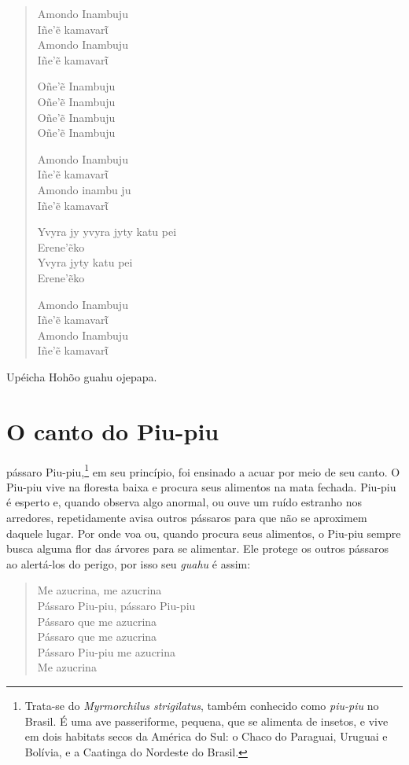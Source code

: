 \begin{verse}
Amondo Inambuju\\
Iñe'ẽ kamavarῖ\\
Amondo Inambuju\\
Iñe'ẽ kamavarῖ

Oñe'ẽ Inambuju\\
Oñe'ẽ Inambuju\\
Oñe'ẽ Inambuju\\
Oñe'ẽ Inambuju

Amondo Inambuju\\
Iñe'ẽ kamavarῖ\\
Amondo inambu ju\\
Iñe'ẽ kamavarῖ

\pagebreak
Yvyra jy yvyra jyty katu pei\\
Erene'ẽko\\
Yvyra jyty katu pei\\
Erene'ẽko

Amondo Inambuju\\
Iñe'ẽ kamavarῖ\\
Amondo Inambuju\\
Iñe'ẽ kamavarῖ
\end{verse}

Upéicha Hohõo guahu ojepapa.

\chapter{O canto do Piu-piu}

 pássaro Piu-piu,\footnote{Trata-se do \textit{Myrmorchilus strigilatus},
  também conhecido como \textit{piu-piu} no Brasil. É uma ave passeriforme,
  pequena, que se alimenta de insetos, e vive em dois habitats secos da
  América do Sul: o Chaco do Paraguai, Uruguai e Bolívia, e a Caatinga
  do Nordeste do Brasil.} em seu princípio, foi ensinado a acuar por
meio de seu canto. O Piu-piu vive na floresta baixa e procura seus
alimentos na mata fechada. Piu-piu é esperto e, quando observa algo
anormal, ou ouve um ruído estranho nos arredores, repetidamente avisa
outros pássaros para que não se aproximem daquele lugar. Por onde voa
ou, quando procura seus alimentos, o Piu-piu sempre busca alguma flor
das árvores para se alimentar. Ele protege os outros pássaros ao
alertá-los do perigo, por isso seu \textit{guahu} é assim:

\begin{verse}
Me azucrina, me azucrina\\
Pássaro Piu-piu, pássaro Piu-piu\\
Pássaro que me azucrina\\
Pássaro que me azucrina\\
Pássaro Piu-piu me azucrina\\
Me azucrina
\end{verse}

